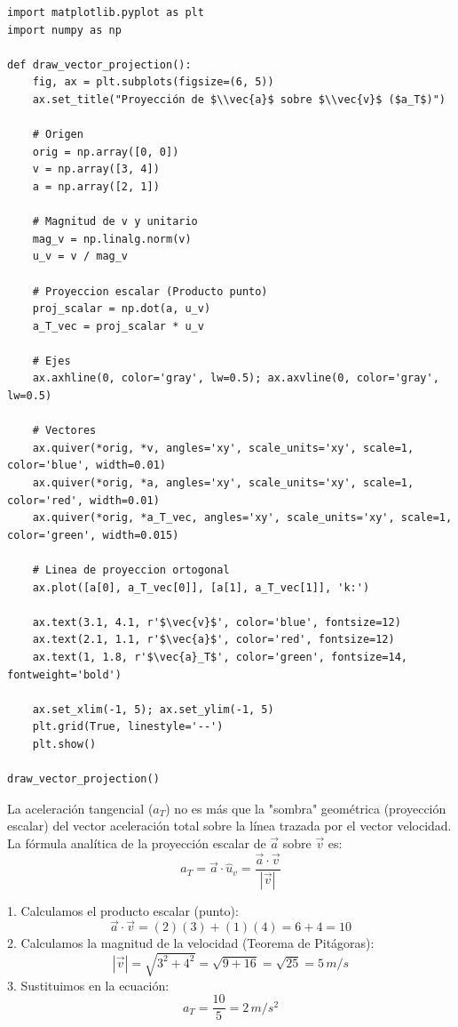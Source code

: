 \documentclass[12pt, a4paper]{article}
\begin{document}
\begin{lstlisting}
import matplotlib.pyplot as plt
import numpy as np

def draw_vector_projection():
    fig, ax = plt.subplots(figsize=(6, 5))
    ax.set_title("Proyección de $\\vec{a}$ sobre $\\vec{v}$ ($a_T$)")
    
    # Origen
    orig = np.array([0, 0])
    v = np.array([3, 4])
    a = np.array([2, 1])
    
    # Magnitud de v y unitario
    mag_v = np.linalg.norm(v)
    u_v = v / mag_v
    
    # Proyeccion escalar (Producto punto)
    proj_scalar = np.dot(a, u_v)
    a_T_vec = proj_scalar * u_v
    
    # Ejes
    ax.axhline(0, color='gray', lw=0.5); ax.axvline(0, color='gray', lw=0.5)
    
    # Vectores
    ax.quiver(*orig, *v, angles='xy', scale_units='xy', scale=1, color='blue', width=0.01)
    ax.quiver(*orig, *a, angles='xy', scale_units='xy', scale=1, color='red', width=0.01)
    ax.quiver(*orig, *a_T_vec, angles='xy', scale_units='xy', scale=1, color='green', width=0.015)
    
    # Linea de proyeccion ortogonal
    ax.plot([a[0], a_T_vec[0]], [a[1], a_T_vec[1]], 'k:')
    
    ax.text(3.1, 4.1, r'$\vec{v}$', color='blue', fontsize=12)
    ax.text(2.1, 1.1, r'$\vec{a}$', color='red', fontsize=12)
    ax.text(1, 1.8, r'$\vec{a}_T$', color='green', fontsize=14, fontweight='bold')
    
    ax.set_xlim(-1, 5); ax.set_ylim(-1, 5)
    plt.grid(True, linestyle='--')
    plt.show()

draw_vector_projection()
\end{lstlisting}

La aceleración tangencial ($a_T$) no es más que la "sombra" geométrica (proyección escalar) del vector aceleración total sobre la línea trazada por el vector velocidad.
La fórmula analítica de la proyección escalar de $\vec{a}$ sobre $\vec{v}$ es:
$$ a_T = \vec{a} \cdot \hat{u}_v = \frac{\vec{a} \cdot \vec{v}}{|\vec{v}|} $$

1. Calculamos el producto escalar (punto):
$$ \vec{a} \cdot \vec{v} = (2)(3) + (1)(4) = 6 + 4 = 10 $$
2. Calculamos la magnitud de la velocidad (Teorema de Pitágoras):
$$ |\vec{v}| = \sqrt{3^2 + 4^2} = \sqrt{9 + 16} = \sqrt{25} = 5\,\si{m/s} $$
3. Sustituimos en la ecuación:
$$ a_T = \frac{10}{5} = 2\,\si{m/s^2} $$
\end{document}
